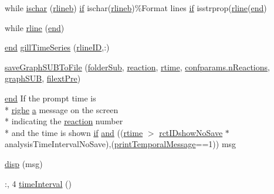 \begin{DoxyCompactItemize}
\item 
while \hyperlink{a00022_aaa2ace52a161710427bdc25dd600089b}{ischar} (\hyperlink{a00022_a8df79027fd85d4a3668754f36e9e88c1}{rlineb}) \hyperlink{a00024_a01d55766b8058903dd360b4bda71f9f5}{if} ischar(\hyperlink{a00022_a8df79027fd85d4a3668754f36e9e88c1}{rlineb})\%Format lines \hyperlink{a00024_a01d55766b8058903dd360b4bda71f9f5}{if} isstrprop(\hyperlink{a00022_ab5b947e1a8b7cf496ffd4eb21317052e}{rline}(\hyperlink{a00019_afb358f48b1646c750fb9da6c6585be2b}{end})
\item 
while \hyperlink{a00022_ab5b947e1a8b7cf496ffd4eb21317052e}{rline} (\hyperlink{a00019_afb358f48b1646c750fb9da6c6585be2b}{end})
\item 
\hyperlink{a00019_afb358f48b1646c750fb9da6c6585be2b}{end} \hyperlink{a00022_ac62d9b6e4b7257c90322e20e1eb8e733}{gill\-Time\-Series} (\hyperlink{a00022_a8443a49765859a8631fed7e8a1d27fe5}{rline\-I\-D},\-:)
\item 
\hyperlink{a00022_af8c5bdc8ca3fe8ddcc8594ecad80560a}{save\-Graph\-S\-U\-B\-To\-File} (\hyperlink{a00022_a05c5bf0305e5d58d4dc25bd89a025678}{folder\-Sub}, \hyperlink{a00022_a4ba2ecb46f808729569ecce2cc1d34c6}{reaction}, \hyperlink{a00022_afc6b38657a313b9f1de2ee356910b6ee}{rtime}, \hyperlink{a00065_a8d704532b4b419f1428cb078bb5c7ffe}{confparams.\-n\-Reactions}, \hyperlink{a00022_acd499d32ebba9c935bab9a19da7a174b}{graph\-S\-U\-B}, \hyperlink{a00022_a527736a425f4f7ead2c2dc9d7b479346}{filext\-Pre})
\item 
\hyperlink{a00019_afb358f48b1646c750fb9da6c6585be2b}{end} If the prompt time is \\*
\hyperlink{a00060_abdf49e297e2c121f2d09f075ac3d518a}{righe} \hyperlink{a00029_a2ffdbad9ea59541e59cbd2b938e0770c}{a} message on the screen \\*
indicating the \hyperlink{a00022_a4ba2ecb46f808729569ecce2cc1d34c6}{reaction} number \\*
and the time is shown \hyperlink{a00024_a01d55766b8058903dd360b4bda71f9f5}{if} \hyperlink{a00022_a170f8acb213f91bf71c77b1d20bceb33}{and} ((\hyperlink{a00022_afc6b38657a313b9f1de2ee356910b6ee}{rtime} $>$ \hyperlink{a00022_aeb449dcc9eb8bfe0321b031e10962ac5}{rct\-I\-Dshow\-No\-Save} $\ast$analysis\-Time\-Interval\-No\-Save),(\hyperlink{a00022_acc16e80f122cc11cf1570c53597afb19}{print\-Temporal\-Message}==1)) msg
\item 
\hyperlink{a00022_a107ac08fa413d7d0c5323dc4330d83fb}{disp} (msg)
\item 
\-:, 4 \hyperlink{a00022_a430673c9821c17e4bf93cd42f59e00bb}{time\-Interval} ()

\end{DoxyCompactItemize}
